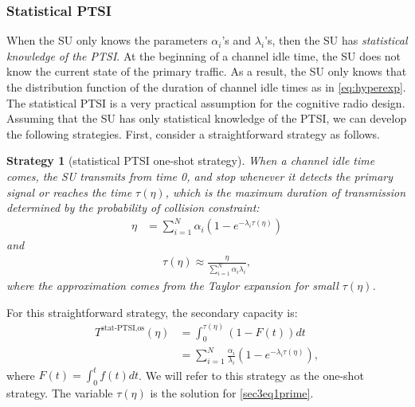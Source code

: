 \documentclass[10pt,final,journal,letterpaper]{IEEEtran}
\newtheorem{strategy}{Strategy}
\begin{document}
\subsubsection{Statistical PTSI}
When the SU only knows the parameters $\alpha_i$'s and $\lambda_i$'s, then the SU has \emph{statistical knowledge of the PTSI}. At the beginning of a channel idle time, the SU does not know the current state of the primary traffic. As a result, the SU only knows that the distribution function of the duration of channel idle times as in \eqref{eq:hyperexp}. The statistical PTSI is a very practical assumption for the cognitive radio design. Assuming that the SU has only statistical knowledge of the PTSI, we can develop the following strategies. First, consider a straightforward strategy as follows.
\begin{strategy}[statistical PTSI one-shot strategy]\label{str1}
When a channel idle time comes, the SU transmits from time 0, and stop whenever it detects the primary signal or reaches the time $\tau(\eta)$, which is the maximum duration of transmission determined by the probability of collision constraint:
\begin{align}\label{sec3eq1prime}
    \eta&=\sum_{i=1}^{N}\alpha_i(1-e^{-\lambda_i\tau(\eta)})
\end{align}
and
\begin{align}
    \tau(\eta)\approx\frac{\eta}{\sum_{i=1}^{N}\alpha_i\lambda_i},\nonumber
\end{align}
where the approximation comes from the Taylor expansion for small $\tau(\eta)$.
\end{strategy}
For this straightforward strategy, the secondary capacity is:
\begin{align}\label{sec3eq111}
    T^{\text{stat-PTSI,os}}(\eta)&=\int_{0}^{\tau(\eta)}(1-F(t))dt\nonumber\\
    &=\sum_{i=1}^N\frac{\alpha_i}{\lambda_i}(1-e^{-\lambda_i\tau(\eta)}),
\end{align}
where $F(t)=\int_0^{t}f(t)dt$. We will refer to this strategy as the one-shot strategy. The variable $\tau(\eta)$ is the solution for \eqref{sec3eq1prime}.
\end{document}
